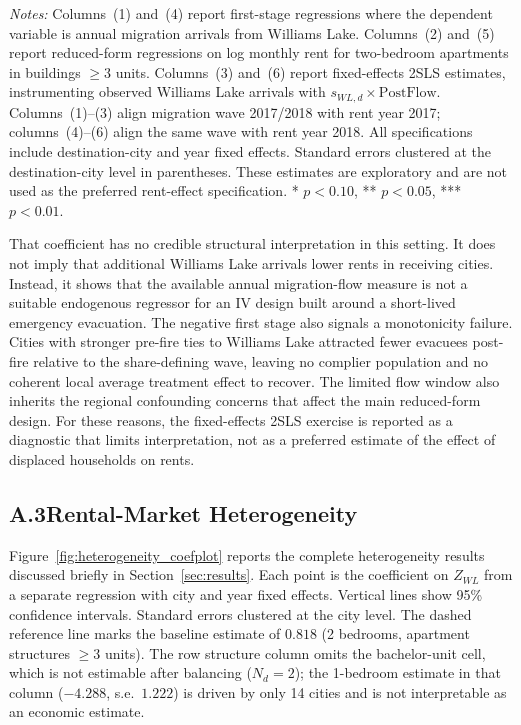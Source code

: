 \documentclass[12pt]{article}
\begin{document}
\begin{table}[!htbp]
\begin{minipage}{0.96\textwidth}
   \footnotesize
   \textit{Notes:} Columns~(1) and~(4) report first-stage regressions where
   the dependent variable is annual migration arrivals from Williams Lake.
   Columns~(2) and~(5) report reduced-form regressions on log monthly rent
   for two-bedroom apartments in buildings $\geq 3$ units. Columns~(3)
   and~(6) report fixed-effects 2SLS estimates, instrumenting observed
   Williams Lake arrivals with $s_{WL,d}\times\mathrm{PostFlow}$.
   Columns~(1)--(3) align migration wave 2017/2018 with rent year 2017;
   columns~(4)--(6) align the same wave with rent year 2018.
   All specifications include destination-city and year fixed effects.
   Standard errors clustered at the destination-city level in parentheses.
   These estimates are exploratory and are not used as the preferred
   rent-effect specification. * $p<0.10$, ** $p<0.05$, *** $p<0.01$.
   \end{minipage}
\end{table}

That coefficient has no credible structural interpretation in this setting. It
does not imply that additional Williams Lake arrivals lower rents in receiving
cities. Instead, it shows that the available annual migration-flow measure is not
a suitable endogenous regressor for an IV design built around a short-lived
emergency evacuation. The negative first stage also signals a monotonicity failure. Cities with
stronger pre-fire ties to Williams Lake attracted fewer evacuees post-fire
relative to the share-defining wave, leaving no complier population and no
coherent local average treatment effect to recover. The limited flow window also inherits the regional
confounding concerns that affect the main reduced-form design. For these reasons,
the fixed-effects 2SLS exercise is reported as a diagnostic that limits interpretation, not
as a preferred estimate of the effect of displaced households on rents.

\FloatBarrier

\subsection*{A.3\quad Rental-Market Heterogeneity}
\label{app:heterogeneity}

Figure~\ref{fig:heterogeneity_coefplot} reports the complete heterogeneity
results discussed briefly in Section~\ref{sec:results}. Each point is the
coefficient on $Z_{WL}$ from a separate regression with city and year fixed
effects. Vertical lines show 95\% confidence intervals. Standard errors clustered
at the city level. The dashed reference line marks the baseline estimate of
$0.818$ (2 bedrooms, apartment structures $\geq 3$ units). The row structure
column omits the bachelor-unit cell, which is not estimable after balancing
($N_d=2$); the 1-bedroom estimate in that column ($-4.288$, s.e.\ $1.222$)
is driven by only 14 cities and is not interpretable as an economic estimate.
\end{document}
